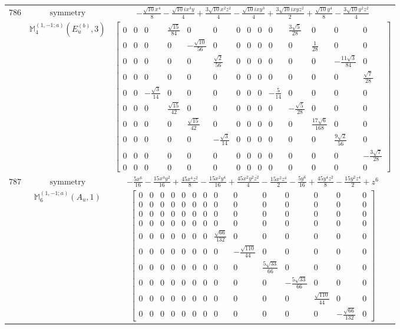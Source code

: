 \documentclass[fleqn,8pt,landscape]{jsarticle}
\begin{document}
\begin{longtable}{ccc}
$ 786 $ & $ \text{symmetry} $ & $ - \frac{\sqrt{10} x^{4}}{8} - \frac{\sqrt{10} i x^{3} y}{4} + \frac{3 \sqrt{10} x^{2} z^{2}}{4} - \frac{\sqrt{10} i x y^{3}}{4} + \frac{3 \sqrt{10} i x y z^{2}}{2} + \frac{\sqrt{10} y^{4}}{8} - \frac{3 \sqrt{10} y^{2} z^{2}}{4} $ \\
$  $ & $ \mathbb{M}_{4}^{(1,-1;a)}(E_{u}^{(b)},3) $ & $ \begin{bmatrix} 0 & 0 & 0 & \frac{\sqrt{15}}{84} & 0 & 0 & 0 & 0 & 0 & 0 & \frac{3 \sqrt{5}}{28} & 0 & 0 & 0 \\ 0 & 0 & 0 & 0 & - \frac{\sqrt{10}}{56} & 0 & 0 & 0 & 0 & 0 & 0 & \frac{1}{28} & 0 & 0 \\ 0 & 0 & 0 & 0 & 0 & \frac{\sqrt{2}}{56} & 0 & 0 & 0 & 0 & 0 & 0 & - \frac{11 \sqrt{3}}{84} & 0 \\ 0 & 0 & 0 & 0 & 0 & 0 & 0 & 0 & 0 & 0 & 0 & 0 & 0 & \frac{\sqrt{7}}{28} \\ 0 & 0 & - \frac{\sqrt{3}}{14} & 0 & 0 & 0 & 0 & 0 & 0 & - \frac{5}{14} & 0 & 0 & 0 & 0 \\ 0 & 0 & 0 & \frac{\sqrt{15}}{42} & 0 & 0 & 0 & 0 & 0 & 0 & - \frac{\sqrt{5}}{28} & 0 & 0 & 0 \\ 0 & 0 & 0 & 0 & \frac{\sqrt{15}}{42} & 0 & 0 & 0 & 0 & 0 & 0 & \frac{17 \sqrt{6}}{168} & 0 & 0 \\ 0 & 0 & 0 & 0 & 0 & - \frac{\sqrt{3}}{14} & 0 & 0 & 0 & 0 & 0 & 0 & \frac{9 \sqrt{2}}{56} & 0 \\ 0 & 0 & 0 & 0 & 0 & 0 & 0 & 0 & 0 & 0 & 0 & 0 & 0 & - \frac{3 \sqrt{7}}{28} \\ 0 & 0 & 0 & 0 & 0 & 0 & 0 & 0 & 0 & 0 & 0 & 0 & 0 & 0 \end{bmatrix} $ \\ \hline
$ 787 $ & $ \text{symmetry} $ & $ - \frac{5 x^{6}}{16} - \frac{15 x^{4} y^{2}}{16} + \frac{45 x^{4} z^{2}}{8} - \frac{15 x^{2} y^{4}}{16} + \frac{45 x^{2} y^{2} z^{2}}{4} - \frac{15 x^{2} z^{4}}{2} - \frac{5 y^{6}}{16} + \frac{45 y^{4} z^{2}}{8} - \frac{15 y^{2} z^{4}}{2} + z^{6} $ \\
$  $ & $ \mathbb{M}_{6}^{(1,-1;a)}(A_{u},1) $ & $ \begin{bmatrix} 0 & 0 & 0 & 0 & 0 & 0 & 0 & 0 & 0 & 0 & 0 & 0 & 0 & 0 \\ 0 & 0 & 0 & 0 & 0 & 0 & 0 & 0 & 0 & 0 & 0 & 0 & 0 & 0 \\ 0 & 0 & 0 & 0 & 0 & 0 & 0 & 0 & 0 & 0 & 0 & 0 & 0 & 0 \\ 0 & 0 & 0 & 0 & 0 & 0 & 0 & 0 & 0 & 0 & 0 & 0 & 0 & 0 \\ 0 & 0 & 0 & 0 & 0 & 0 & 0 & \frac{\sqrt{66}}{132} & 0 & 0 & 0 & 0 & 0 & 0 \\ 0 & 0 & 0 & 0 & 0 & 0 & 0 & 0 & - \frac{\sqrt{110}}{44} & 0 & 0 & 0 & 0 & 0 \\ 0 & 0 & 0 & 0 & 0 & 0 & 0 & 0 & 0 & \frac{5 \sqrt{33}}{66} & 0 & 0 & 0 & 0 \\ 0 & 0 & 0 & 0 & 0 & 0 & 0 & 0 & 0 & 0 & - \frac{5 \sqrt{33}}{66} & 0 & 0 & 0 \\ 0 & 0 & 0 & 0 & 0 & 0 & 0 & 0 & 0 & 0 & 0 & \frac{\sqrt{110}}{44} & 0 & 0 \\ 0 & 0 & 0 & 0 & 0 & 0 & 0 & 0 & 0 & 0 & 0 & 0 & - \frac{\sqrt{66}}{132} & 0 \end{bmatrix} $ \\ \hline

\end{longtable}
\end{document}
